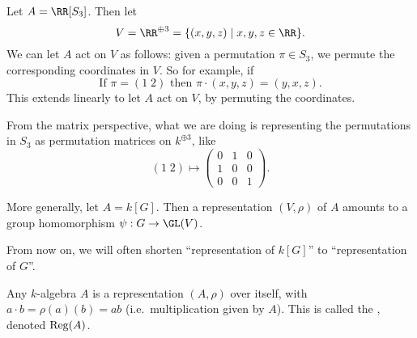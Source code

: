 \begin{example}
	\listhack
	\begin{enumerate}[(a)]
		\ii Let $A = \RR[S_3]$.
		Then let 
		\[ V = \RR^{\oplus 3} = \{ (x,y,z) \mid x,y,z \in \RR \}. \]
		We can let $A$ act on $V$ as follows:
		given a permutation $\pi \in S_3$, we permute the corresponding
		coordinates in $V$.
		So for example, if 
		\[ \text{If } \pi = (1 \; 2)
		\text{ then } \pi \cdot (x,y,z) = (y,x,z). \]
		This extends linearly to let $A$ act on $V$,
		by permuting the coordinates.

		From the matrix perspective, what we are doing
		is representing the permutations in $S_3$
		as permutation matrices on $k^{\oplus 3}$, like
		\[ (1 \; 2)
		\mapsto \begin{pmatrix} 0&1&0 \\ 1&0&0 \\ 0&0&1 \end{pmatrix}. \]
		
		\ii More generally, let $A = k[G]$.
		Then a representation $(V, \rho)$ of $A$ amounts to 
		a group homomorphism $\psi : G \to \GL(V)$.
	\end{enumerate}
\end{example}
\begin{abuse}
	From now on, we will often shorten ``representation of $k[G]$''
	to ``representation of $G$''.
\end{abuse}
\begin{example}
	Any $k$-algebra $A$ is a representation $(A, \rho)$ over itself,
	with $a \cdot b = \rho(a)(b) = ab$ (i.e.\ multiplication given by $A$).
	This is called the , denoted $\operatorname{Reg}(A)$.
\end{example}

